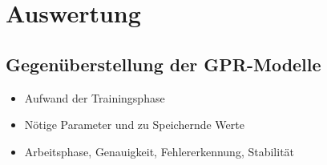 %

\chapter{Auswertung}\label{ch:auswertung}

\section{Gegenüberstellung der GPR-Modelle}\label{sec:gegenueberstellung-gpr-modelle}
	\begin{itemize}
		\item Aufwand der Trainingsphase
		\item Nötige Parameter und zu Speichernde Werte
		\item Arbeitsphase, Genauigkeit, Fehlererkennung, Stabilität
	\end{itemize}